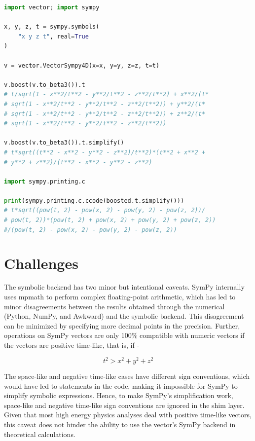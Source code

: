 \documentclass{webofc}
\begin{document}
\begin{lstlisting}[language=Python,mathescape=true,caption={Simplifying expressions and converting theem into code for another programming language.},captionpos=b, label={vector-sympy-extra}]
import vector; import sympy

x, y, z, t = sympy.symbols(
    "x y z t", real=True
)

v = vector.VectorSympy4D(x=x, y=y, z=z, t=t)

v.boost(v.to_beta3()).t
# t/sqrt(1 - x**2/t**2 - y**2/t**2 - z**2/t**2) + x**2/(t*
# sqrt(1 - x**2/t**2 - y**2/t**2 - z**2/t**2)) + y**2/(t*
# sqrt(1 - x**2/t**2 - y**2/t**2 - z**2/t**2)) + z**2/(t*
# sqrt(1 - x**2/t**2 - y**2/t**2 - z**2/t**2))

v.boost(v.to_beta3()).t.simplify()
# t*sqrt((t**2 - x**2 - y**2 - z**2)/t**2)*(t**2 + x**2 +
# y**2 + z**2)/(t**2 - x**2 - y**2 - z**2)

import sympy.printing.c

print(sympy.printing.c.ccode(boosted.t.simplify()))
# t*sqrt((pow(t, 2) - pow(x, 2) - pow(y, 2) - pow(z, 2))/
# pow(t, 2))*(pow(t, 2) + pow(x, 2) + pow(y, 2) + pow(z, 2))
#/(pow(t, 2) - pow(x, 2) - pow(y, 2) - pow(z, 2))
\end{lstlisting}

\section{Challenges}
\label{sec-challenges}

The symbolic backend has two minor but intentional caveats. SymPy internally uses mpmath \cite{mpmath} to perform complex floating-point arithmetic, which has led to minor disagreements between the results obtained through the numerical (Python, NumPy, and Awkward) and the symbolic backend. This disagreement can be minimized by specifying more decimal points in the precision. Further, operations on SymPy vectors are only 100\% compatible with numeric vectors if the vectors are positive time-like, that is, if -

\begin{equation}
t^{2} > x^{2} + y^{2} + z^{2}
\end{equation}

The space-like and negative time-like cases have different sign conventions, which would have led to  statements in the code, making it impossible for SymPy to simplify symbolic expressions. Hence, to make SymPy's simplification work, space-like and negative time-like sign conventions are ignored in the shim layer. Given that most high energy physics analyses deal with positive time-like vectors, this caveat does not hinder the ability to use the vector's SymPy backend in theoretical calculations.
\end{document}

